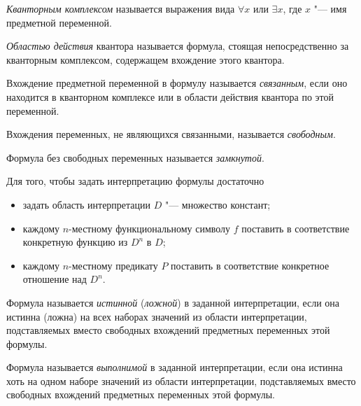 \begin{definition}
	\emph{Кванторным комплексом} называется выражения вида $ \forall x $ или $ \exists x $, где $ x $ "--- имя предметной переменной.
\end{definition}

\begin{definition}
	\emph{Областью действия} квантора называется формула, стоящая непосредственно за кванторным комплексом, содержащем вхождение этого квантора.
\end{definition}

\begin{definition}
	Вхождение предметной переменной в формулу называется \emph{связанным}, если оно находится в кванторном комплексе или в области действия квантора по этой переменной.

	Вхождения переменных, не являющихся связанными, называется \emph{свободным}.
\end{definition}

\begin{definition}
	Формула без свободных переменных называется \emph{замкнутой}.
\end{definition}

\begin{definition}
	Для того, чтобы задать интерпретацию формулы достаточно
	\begin{itemize}
		\item задать область интерпретации $ D $ "--- множество констант;
		\item каждому $ n $-местному функциональному символу $ f $ поставить в соответствие конкретную функцию из $ D^n $ в $ D $;
		\item каждому $ n $-местному предикату $ P $ поставить в соответствие конкретное отношение над $ D^n $.
	\end{itemize}
\end{definition}

\begin{definition}
	Формула называется \emph{истинной} (\emph{ложной}) в заданной интерпретации, если она истинна (ложна) на всех наборах значений из области интерпретации, подставляемых вместо свободных вхождений предметных переменных этой формулы.
\end{definition}

\begin{definition}
	Формула называется \emph{выполнимой} в заданной интерпретации, если она истинна хоть на одном наборе значений из области интерпретации, подставляемых вместо свободных вхождений предметных переменных этой формулы.
\end{definition}

